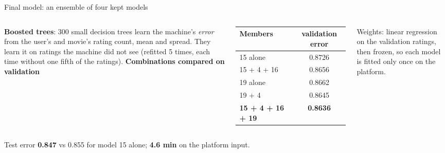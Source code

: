 \documentclass[aspectratio=169,11pt]{beamer}
\newcommand{\key}[1]{\textcolor{accent}{\textbf{#1}}}
\newcommand{\muted}[1]{\textcolor{soft}{#1}}
\newcommand{\takeaway}[1]{\vfill\begin{center}\colorbox{accent!8}{\parbox{0.9\textwidth}{\centering #1}}\end{center}}
\begin{document}
\begin{frame}{Final model: an ensemble of four kept models}
\begin{columns}[c]

\vspace{0.5em}
\footnotesize
\textbf{Boosted trees}: 300 small decision trees learn the machine's \emph{error} from the
user's and movie's rating count, mean and spread. They learn it on ratings the machine
did not see (refitted 5 times, each time without one fifth of the ratings).
\footnotesize
\textbf{Combinations compared on validation}\\[0.3em]
\begin{tabular}{@{}lc@{}}
\toprule
Members & validation error \\
\midrule
15 alone & 0.8726 \\
15 + 4 + 16 & 0.8656 \\
19 alone & 0.8662 \\
19 + 4 & 0.8645 \\
\key{15 + 4 + 16 + 19} & \key{0.8636} \\
\bottomrule
\end{tabular}

\vspace{0.4em}
\muted{\footnotesize Weights: linear regression on the validation ratings, then frozen,
so each model is fitted only once on the platform.}
\end{columns}
\takeaway{Test error \key{0.847} vs 0.855 for model 15 alone; \key{4.6 min} on the platform input.}
\end{frame}
\end{document}
